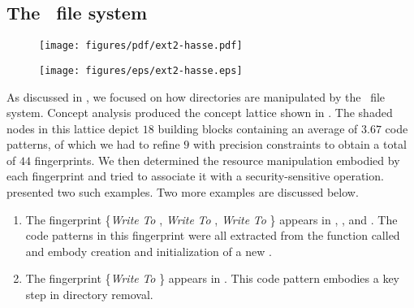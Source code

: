 \subsection{The \ext\ file system}
\label{subsection:results:ext2}

\begin{figure}[ht!]
\begin{center}
\ifpdf
\centerline{\texttt{[image: figures/pdf/ext2-hasse.pdf]}}
\else
\centerline{\texttt{[image: figures/eps/ext2-hasse.eps]}}
\fi
\end{center} 
\end{figure}

As discussed in , we focused on how
directories are manipulated by the \ext~file system. Concept analysis produced
the concept lattice shown in . The shaded
nodes in this lattice depict $18$ building blocks containing an average
of $3.67$ code patterns, of which we had to refine $9$ with precision
constraints to obtain a total of $44$ fingerprints.  We then determined the
resource manipulation embodied by each fingerprint and tried to associate it
with a security-sensitive operation.  
presented two such examples. Two more examples are discussed below.


\begin{enumerate}
%
\item The fingerprint \{\textit{Write}  \textit{To}
, \textit{Write}  \textit{To}
, \textit{Write}  \textit{To}
\} appears in
, ,  and
.  The code patterns in this fingerprint were all
extracted from the function called  and embody creation
and initialization of a new . 
%
\item The fingerprint \{\textit{Write}  \textit{To}
\} appears in . This code pattern
embodies a key step in directory removal. 
%
\end{enumerate}

